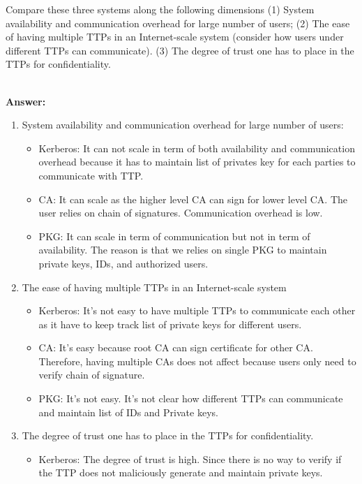 \documentclass[11pt]{article}
\newcommand{\ans}[1]{\begin{mdframed}\textbf{Answer: }#1\end{mdframed}}
\begin{document}
\begin{description}
Compare these three systems along the following dimensions (1) System availability and communication overhead for large number of users; (2) The ease of having multiple TTPs in an Internet-scale system (consider how users under different TTPs can communicate).
(3) The degree of trust one has to place in the TTPs for confidentiality.\\[0.1in]
 \\
 \ans{
 \begin{enumerate}
   \item System availability and communication overhead for large number of users: 
    \begin{itemize}
       \item Kerberos: It can not scale in term of both availability and communication overhead because it has to maintain list of privates key for each parties to communicate with TTP. 
       \item CA: It can scale as the higher level CA can sign for lower level CA. The user relies on chain of signatures. Communication overhead is low. 
       \item PKG: It can scale in term of communication but not in term of availability. The reason is that we relies on single PKG to maintain private keys, IDs, and authorized users. 
     \end{itemize} 
   \item The ease of having multiple TTPs in an Internet-scale system
    \begin{itemize}
      \item Kerberos: It's not easy to have multiple TTPs to communicate each other as it have to keep track list of private keys for different users. 
       \item CA: It's easy because root CA can sign certificate for other CA. Therefore, having multiple CAs does not affect because users only need to verify chain of signature. 
       \item PKG: It's not easy. It's not clear how different TTPs can communicate and maintain list of IDs and Private keys.
    \end{itemize}
   \item The degree of trust one has to place in the TTPs for confidentiality.
    \begin{itemize}
      \item Kerberos: The degree of trust is high. Since there is no way to verify if the TTP does not maliciously generate and maintain private keys.

\end{itemize}
\end{enumerate}}
\end{description}
\end{document}
